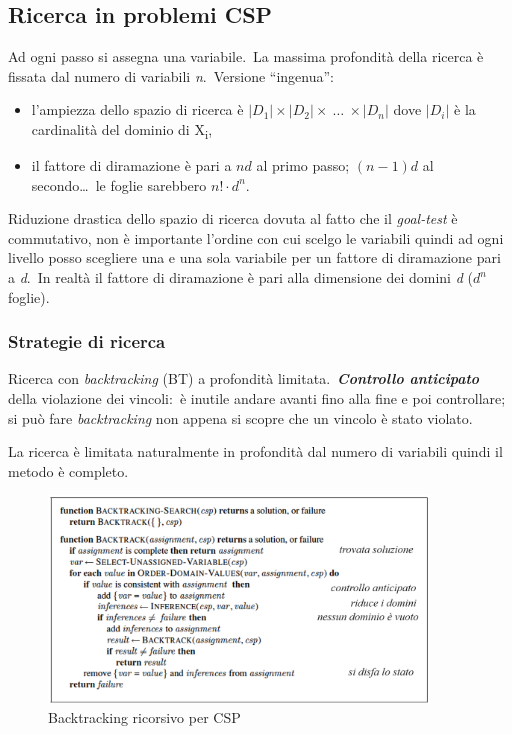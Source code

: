 \subsection{Ricerca in problemi CSP}
Ad ogni passo si assegna una variabile.\
La massima profondità della ricerca è fissata dal numero di variabili \textit{n}.\
Versione ``ingenua'':
\begin{itemize}
	\item l'ampiezza dello spazio di ricerca è $|D_1|\times|D_2|\times\ \dots\ \times|D_n|$ dove $|D_i|$ è la cardinalità del dominio di X\textsubscript{i},
	\item il fattore di diramazione è pari a $nd$ al primo passo; $(n-1) d$ al secondo\dots\ le foglie sarebbero $n! \cdot d^n$.
\end{itemize}
Riduzione drastica dello spazio di ricerca dovuta al fatto che il \textit{goal-test} è commutativo, non è importante l'ordine con cui scelgo le variabili quindi ad ogni livello posso scegliere una e una sola variabile per un fattore di diramazione pari a \textit{d}.\
In realtà il fattore di diramazione è pari alla dimensione dei domini \textit{d} ($d^n$ foglie).

\subsubsection{Strategie di ricerca}
Ricerca con \textit{backtracking} (BT) a profondità limitata.\
\textbf{\textit{Controllo anticipato}} della violazione dei vincoli:\ è inutile andare avanti fino alla fine e poi controllare; si può fare \textit{backtracking} non appena si scopre che un vincolo è stato violato.\

La ricerca è limitata naturalmente in profondità dal numero di variabili quindi il metodo è completo.\

\begin{figure}[H]
	\centering
	\caption*{Backtracking ricorsivo per CSP}
	\includegraphics[width=0.9\textwidth]{immagini/Backtracking_rec.png}
\end{figure}

